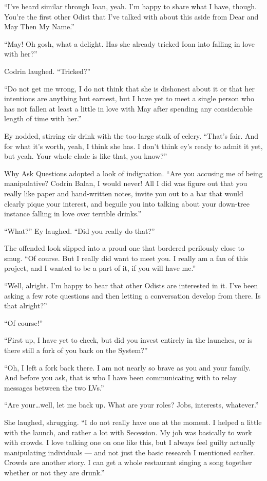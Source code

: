 ``I've heard similar through Ioan, yeah. I'm happy to share what I have, though. You're the first other Odist that I've talked with about this aside from Dear and May Then My Name.''

``May! Oh gosh, what a delight. Has she already tricked Ioan into falling in love with her?''

Codrin laughed. ``Tricked?''

``Do not get me wrong, I do not think that she is dishonest about it or that her intentions are anything but earnest, but I have yet to meet a single person who has not fallen at least a little in love with May after spending any considerable length of time with her.''

Ey nodded, stirring eir drink with the too-large stalk of celery. ``That's fair. And for what it's worth, yeah, I think she has. I don't think ey's ready to admit it yet, but yeah. Your whole clade is like that, you know?''

Why Ask Questions adopted a look of indignation. ``Are you accusing me of being manipulative? Codrin Balan, I would never! All I did was figure out that you really like paper and hand-written notes, invite you out to a bar that would clearly pique your interest, and beguile you into talking about your down-tree instance falling in love over terrible drinks.''

``What?'' Ey laughed. ``Did you really do that?''

The offended look slipped into a proud one that bordered perilously close to smug. ``Of course. But I really did want to meet you. I really am a fan of this project, and I wanted to be a part of it, if you will have me.''

``Well, alright. I'm happy to hear that other Odists are interested in it. I've been asking a few rote questions and then letting a conversation develop from there. Is that alright?''

``Of course!''

``First up, I have yet to check, but did you invest entirely in the launches, or is there still a fork of you back on the System?''

``Oh, I left a fork back there. I am not nearly so brave as you and your family. And before you ask, that is who I have been communicating with to relay messages between the two LVs.''

``Are your\ldots well, let me back up. What are your roles? Jobs, interests, whatever.''

She laughed, shrugging. ``I do not really have one at the moment. I helped a little with the launch, and rather a lot with Secession. My job was basically to work with crowds. I love talking one on one like this, but I always feel guilty actually manipulating individuals — and not just the basic research I mentioned earlier. Crowds are another story. I can get a whole restaurant singing a song together whether or not they are drunk.''


